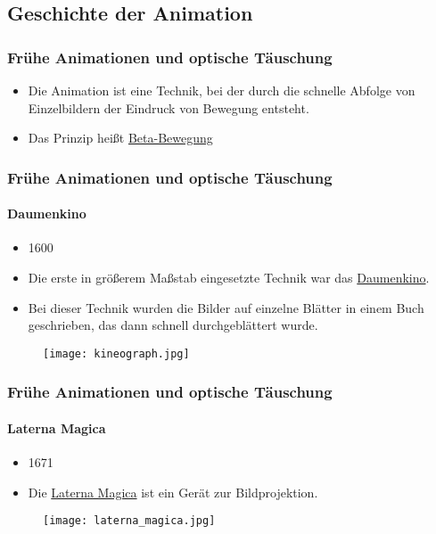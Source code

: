 \subsection{Geschichte der Animation}
\begin{frame}
    \frametitle{Frühe Animationen und optische Täuschung}
    \begin{itemize}
        \item Die Animation ist eine Technik, bei der durch die schnelle Abfolge von Einzelbildern der Eindruck von Bewegung entsteht.
        \item Das Prinzip heißt \href{https://de.wikipedia.org/wiki/Beta-Bewegung}{Beta-Bewegung}
    \end{itemize}
\end{frame}

\begin{frame}
    \frametitle{Frühe Animationen und optische Täuschung}
    \framesubtitle{Daumenkino}
    \begin{minipage}{0.5\textwidth}
        \begin{itemize}
            \item 1600
            \item Die erste in größerem Maßstab eingesetzte Technik war das \href{https://de.wikipedia.org/wiki/Daumenkino}{Daumenkino}.
            \item Bei dieser Technik wurden die Bilder auf einzelne Blätter in einem Buch geschrieben, das dann schnell durchgeblättert wurde.
        \end{itemize}
    \end{minipage} \hfill
    \begin{minipage}{0.45\textwidth}
        \begin{figure}
            \texttt{[image: kineograph.jpg]}
        \end{figure}
    \end{minipage}
\end{frame}

\begin{frame}
    \frametitle{Frühe Animationen und optische Täuschung}
    \framesubtitle{Laterna Magica}
    \begin{minipage}{0.5\textwidth}
        \begin{itemize}
            \item 1671
            \item Die \href{https://de.wikipedia.org/wiki/Laterna_magica}{Laterna Magica} ist ein Gerät zur Bildprojektion.
        \end{itemize}
    \end{minipage} \hfill
    \begin{minipage}{0.45\textwidth}
        \begin{figure}
            \texttt{[image: laterna\_magica.jpg]}
        \end{figure}
    \end{minipage}
\end{frame}


